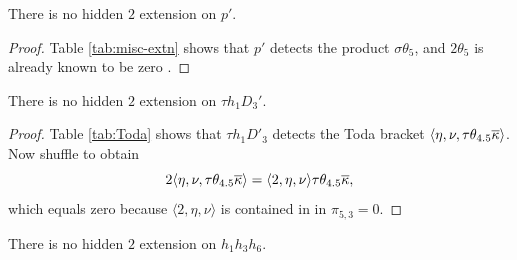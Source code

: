 \begin{lemma}
\label{lem:2-p'}
There is no hidden $2$ extension on $p'$.
\end{lemma}

\begin{proof}
Table \ref{tab:misc-extn} shows that $p'$
detects the product $\sigma \theta_5$, and 
$2 \theta_5$ is already known to be zero
\cite{Xu16}.
\end{proof}

\begin{lemma}
\label{lem:2-th1D3'}
There is no hidden $2$ extension on $\tau h_1 D_3'$.
\end{lemma}

\begin{proof}
Table \ref{tab:Toda} shows that 
$\tau h_1 D'_3$ detects the Toda bracket 
$\langle \eta, \nu, \tau \theta_{4.5} \overline{\kappa} \rangle$.
Now shuffle to obtain
\[
2 \langle \eta, \nu, \tau \theta_{4.5} \overline{\kappa} \rangle =
\langle 2, \eta, \nu \rangle \tau \theta_{4.5} \overline{\kappa},
\]
which equals zero because $\langle 2, \eta, \nu \rangle$
is contained in in $\pi_{5,3} = 0$.
\end{proof}

\begin{lemma}
\label{lem:2-h1h3h6}
There is no hidden $2$ extension on $h_1 h_3 h_6$.
\end{lemma}

